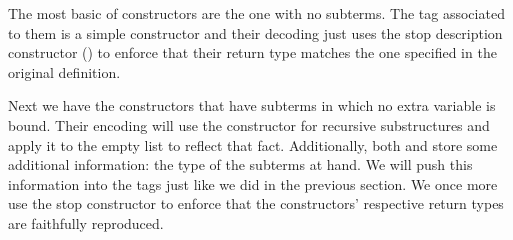 \noindent\begin{minipage}[t]{0.5\textwidth}
\end{minipage}\begin{minipage}[t]{0.5\textwidth}
  \begin{AgdaSuppressSpace}
  \end{AgdaSuppressSpace}
\end{minipage}

The most basic of constructors are the one with no subterms. The tag
associated to them is a simple constructor and their decoding just
uses the stop description constructor () to enforce that
their return type matches the one specified in the original definition.

\noindent\begin{minipage}[t]{0.4\textwidth}
\end{minipage}\begin{minipage}[t]{0.6\textwidth}
  \begin{AgdaSuppressSpace}
  \end{AgdaSuppressSpace}
\end{minipage}

Next we have the constructors that have subterms in which no extra variable
is bound. Their encoding will use the constructor for recursive substructures
and apply it to the empty list to reflect that fact. Additionally, both
 and  store some additional information: the type of
the subterms at hand. We will push this information into the tags just like
we did in the previous section. We once more use the stop constructor to
enforce that the constructors' respective return types are faithfully
reproduced.

\noindent\begin{minipage}[t]{0.4\textwidth}
\end{minipage}\begin{minipage}[t]{0.6\textwidth}
  \begin{AgdaSuppressSpace}
  \end{AgdaSuppressSpace}
\end{minipage}

